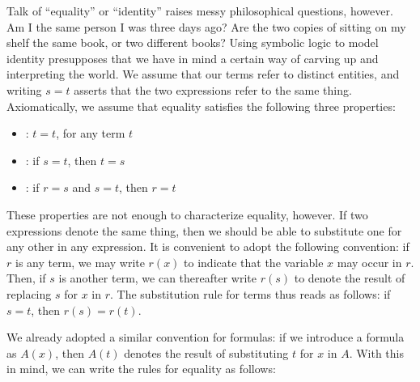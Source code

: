 \documentclass[letterpaper,10pt,english]{sphinxmanual}
\begin{document}
\sphinxAtStartPar
Talk of “equality” or “identity” raises messy philosophical questions, however. Am I the same person I was three days ago? Are the two copies of  sitting on my shelf the same book, or two different books? Using symbolic logic to model identity presupposes that we have in mind a certain way of carving up and interpreting the world. We assume that our terms refer to distinct entities, and writing \(s = t\) asserts that the two expressions refer to the same thing. Axiomatically, we assume that equality satisfies the following three properties:
\begin{itemize}
\item {} 
\sphinxAtStartPar
{}: \(t = t\), for any term \(t\)

\item {} 
\sphinxAtStartPar
{}: if \(s = t\), then \(t = s\)

\item {} 
\sphinxAtStartPar
{}: if \(r = s\) and \(s = t\), then \(r = t\)

\end{itemize}

\sphinxAtStartPar
These properties are not enough to characterize equality, however. If two expressions denote the same thing, then we should be able to substitute one for any other in any expression. It is convenient to adopt the following convention: if \(r\) is any term, we may write \(r(x)\) to indicate that the variable \(x\) may occur in \(r\). Then, if \(s\) is another term, we can thereafter write \(r(s)\) to denote the result of replacing \(s\) for \(x\) in \(r\). The substitution rule for terms thus reads as follows: if \(s = t\), then \(r(s) = r(t)\).

\sphinxAtStartPar
We already adopted a similar convention for formulas: if we introduce a formula as \(A(x)\), then \(A(t)\) denotes the result of substituting \(t\) for \(x\) in \(A\). With this in mind, we can write the rules for equality as follows:



\begin{center}
\AXM{}
\DP
\quad
{}
\DP
\quad
{}
\DP
\\
\ \\
\DP
\quad
{}
\DP
\end{center}
\end{document}
